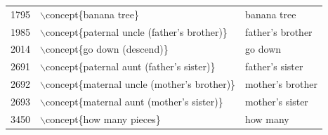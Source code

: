 \begin{table}[ht]
\begin{tabular}{rll}
  1795 & $\backslash$concept\{banana tree\} & banana tree \\ 
  1985 & $\backslash$concept\{paternal uncle (father's brother)\} & father's brother \\ 
  2014 & $\backslash$concept\{go down (descend)\} & go down \\ 
  2691 & $\backslash$concept\{paternal aunt (father's sister)\} & father's sister \\ 
  2692 & $\backslash$concept\{maternal uncle (mother's brother)\} & mother's brother \\ 
  2693 & $\backslash$concept\{maternal aunt (mother's sister)\} & mother's sister \\ 
  3450 & $\backslash$concept\{how many pieces\} & how many \\ 
   \hline
\end{tabular}
\end{table}
